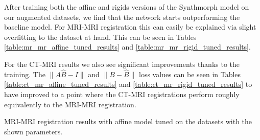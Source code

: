After training both the affine and rigids versions of the Synthmorph model on our augmented datasets, we find that the network starts outperforming the baseline model. For MRI-MRI registration this can easily be explained via slight overfitting to the dataset at hand. This can be seen in Tables \ref{table:mr_mr_affine_tuned_results} and \ref{table:mr_mr_rigid_tuned_results}.

For the CT-MRI results we also see significant improvements thanks to the training. The $\|A\hat{B} - I\|$ and $\|B - \hat{B}\|$ loss values can be seen in Tables \ref{table:ct_mr_affine_tuned_results} and \ref{table:ct_mr_rigid_tuned_results} to have improved to a point where the CT-MRI registrations perform roughly equivalently to the MRI-MRI registration.

\begin{table}[h!]
\centering
\begin{minipage}{0.48\textwidth}
\centering
{}
\caption{MRI-MRI registration results with affine model tuned on the datasets with the shown parameters.}
\label{table:mr_mr_affine_tuned_results}
\end{minipage}
\hfill
\begin{minipage}{0.48\textwidth}
\centering
{}
\caption{CT-MRI registration results with affine model tuned on the datasets with the shown parameters.}
\label{table:ct_mr_affine_tuned_results}
\end{minipage}
\end{table}

